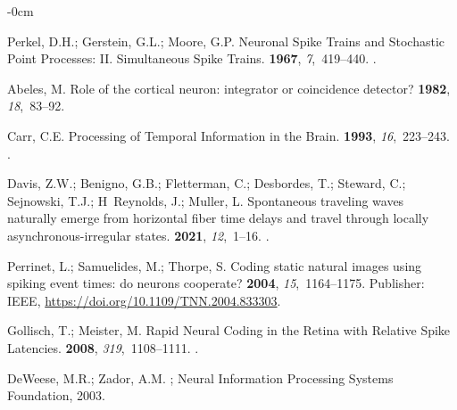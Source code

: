 \documentclass[brainsci, %
               review,submit,pdftex,moreauthors
               ]{Definitions/mdpi}
\begin{document}
\begin{adjustwidth}{-\extralength}{0cm}
\begin{thebibliography}{999}
  Perkel, D.H.; Gerstein, G.L.; Moore, G.P.
  \newblock Neuronal {Spike} {Trains} and {Stochastic} {Point} {Processes}: {II}.
    {Simultaneous} {Spike} {Trains}.
   {\bf 1967}, {\em 7},~419--440.
  .
  
  Abeles, M.
  \newblock Role of the cortical neuron: integrator or coincidence detector?
   {\bf 1982}, {\em
    18},~83--92.
  
  Carr, C.E.
  \newblock Processing of {Temporal} {Information} in the {Brain}.
   {\bf 1993}, {\em 16},~223--243.
  .
  
  Davis, Z.W.; Benigno, G.B.; Fletterman, C.; Desbordes, T.; Steward, C.;
    Sejnowski, T.J.; H~Reynolds, J.; Muller, L.
  \newblock Spontaneous traveling waves naturally emerge from horizontal fiber
    time delays and travel through locally asynchronous-irregular states.
   {\bf 2021}, {\em 12},~1--16.
  .
  
  Perrinet, L.; Samuelides, M.; Thorpe, S.
  \newblock Coding static natural images using spiking event times: do neurons
    cooperate?
   {\bf 2004}, {\em
    15},~1164--1175.
  \newblock Publisher: IEEE, {\url{https://doi.org/10.1109/TNN.2004.833303}}.
  
  Gollisch, T.; Meister, M.
  \newblock Rapid {Neural} {Coding} in the {Retina} with {Relative} {Spike}
    {Latencies}.
   {\bf 2008}, {\em 319},~1108--1111.
  .
  
  DeWeese, M.R.; Zador, A.M.
  ; Neural Information Processing
    Systems Foundation,  2003.
  

\end{thebibliography}
\end{adjustwidth}
\end{document}
